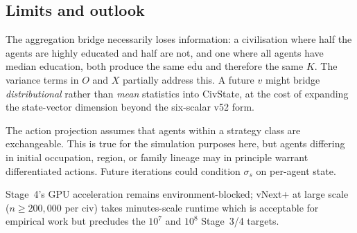 \subsection{Limits and outlook}

The aggregation bridge necessarily loses information: a civilisation
where half the agents are highly educated and half are not, and one
where all agents have median education, both produce the same
$\overline{\text{edu}}$ and therefore the same $K$. The variance terms
in $O$ and $X$ partially address this. A future $v$ might bridge
\emph{distributional} rather than \emph{mean} statistics into
CivState, at the cost of expanding the state-vector dimension beyond
the six-scalar v52 form.

The action projection assumes that agents within a strategy class are
exchangeable. This is true for the simulation purposes here, but
agents differing in initial occupation, region, or family lineage may
in principle warrant differentiated actions. Future iterations could
condition $\sigma_s$ on per-agent state.

Stage~4's GPU acceleration remains environment-blocked; vNext+ at
large scale ($n \ge 200{,}000$ per civ) takes minutes-scale runtime
which is acceptable for empirical work but precludes the $10^7$ and
$10^8$ Stage~3/4 targets.
